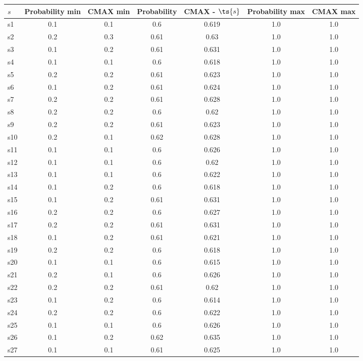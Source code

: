 \documentclass{article}
\begin{document}
\noindent\begin{tabular}{|l|c|c|c|c|c|c|}
\hline
$s$& Probability min & CMAX min & Probability & CMAX - $\ts{s}$ & Probability max & CMAX max\\
\hline
s1 &0.1 & 0.1 & 0.6 & 0.619 & 1.0 & 1.0\\
\hline
s2 &0.2 & 0.3 & 0.61 & 0.63 & 1.0 & 1.0\\
\hline
s3 &0.1 & 0.2 & 0.61 & 0.631 & 1.0 & 1.0\\
\hline
s4 &0.1 & 0.1 & 0.6 & 0.618 & 1.0 & 1.0\\
\hline
s5 &0.2 & 0.2 & 0.61 & 0.623 & 1.0 & 1.0\\
\hline
s6 &0.1 & 0.2 & 0.61 & 0.624 & 1.0 & 1.0\\
\hline
s7 &0.2 & 0.2 & 0.61 & 0.628 & 1.0 & 1.0\\
\hline
s8 &0.2 & 0.2 & 0.6 & 0.62 & 1.0 & 1.0\\
\hline
s9 &0.2 & 0.2 & 0.61 & 0.623 & 1.0 & 1.0\\
\hline
s10 &0.2 & 0.1 & 0.62 & 0.628 & 1.0 & 1.0\\
\hline
s11 &0.1 & 0.1 & 0.6 & 0.626 & 1.0 & 1.0\\
\hline
s12 &0.1 & 0.1 & 0.6 & 0.62 & 1.0 & 1.0\\
\hline
s13 &0.1 & 0.1 & 0.6 & 0.622 & 1.0 & 1.0\\
\hline
s14 &0.1 & 0.2 & 0.6 & 0.618 & 1.0 & 1.0\\
\hline
s15 &0.1 & 0.2 & 0.61 & 0.631 & 1.0 & 1.0\\
\hline
s16 &0.2 & 0.2 & 0.6 & 0.627 & 1.0 & 1.0\\
\hline
s17 &0.2 & 0.2 & 0.61 & 0.631 & 1.0 & 1.0\\
\hline
s18 &0.1 & 0.2 & 0.61 & 0.621 & 1.0 & 1.0\\
\hline
s19 &0.2 & 0.2 & 0.6 & 0.618 & 1.0 & 1.0\\
\hline
s20 &0.1 & 0.1 & 0.6 & 0.615 & 1.0 & 1.0\\
\hline
s21 &0.2 & 0.1 & 0.6 & 0.626 & 1.0 & 1.0\\
\hline
s22 &0.2 & 0.2 & 0.61 & 0.62 & 1.0 & 1.0\\
\hline
s23 &0.1 & 0.2 & 0.6 & 0.614 & 1.0 & 1.0\\
\hline
s24 &0.2 & 0.2 & 0.6 & 0.622 & 1.0 & 1.0\\
\hline
s25 &0.1 & 0.1 & 0.6 & 0.626 & 1.0 & 1.0\\
\hline
s26 &0.1 & 0.2 & 0.62 & 0.635 & 1.0 & 1.0\\
\hline
s27 &0.1 & 0.1 & 0.61 & 0.625 & 1.0 & 1.0\\

\end{tabular}
\end{document}
